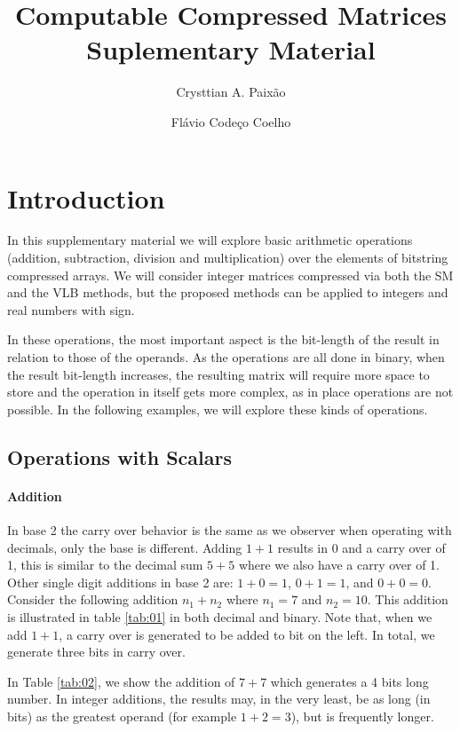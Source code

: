 \documentclass[12pt]{article}
\title{Computable Compressed Matrices\\Suplementary Material}
\author{Crysttian A. Paixão \and Flávio Codeço Coelho}
\begin{document}
\maketitle

\section{Introduction}

In this supplementary material we will explore basic arithmetic operations
(addition, subtraction, division and multiplication) over the elements of
bitstring compressed arrays. We will consider integer matrices compressed via
both the SM and the VLB methods,  but the proposed 
methods can be applied to integers and real numbers with sign.

In these operations, the most important aspect is the bit-length of the result
in relation to those of the operands. As the operations are all done in
binary, when the result bit-length increases, the resulting matrix will require
more space to store and the operation in itself gets more complex, as in place
operations are not possible. In the following examples, we will explore these
kinds of operations.

\subsection{Operations with Scalars}

\paragraph{Addition}

In base 2 the carry over behavior is the same as we observer when operating
with decimals, only the base is different. Adding $1+1$ results in $0$ and a
carry over of 1, this is similar to the decimal sum $5+5$ where we also have a
carry over of 1. Other single digit additions in base 2 are: $1 + 0
= 1$, $0 + 1 = 1$, and $0 + 0 = 0$. Consider the following addition $n_1+n_2$
where $n_1=7$ and $n_2=10$. This addition is illustrated in table \ref{tab:01}
in both decimal and binary. Note that, when we add $1+1$, a carry over is
generated to be added to bit on the left. In total, we generate three bits in
carry over.

In Table \ref{tab:02}, we show the addition of $7 + 7$ which generates a 4 bits
long number. In integer additions, the results may, in the very least, be as
long (in bits) as the greatest operand (for example $1+2=3$), but is frequently
longer.
\end{document}
